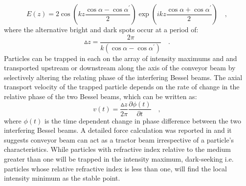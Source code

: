 \begin{equation}
\label{eq:conveyor electric field axis}
E(z) = 2 \cos \left( kz\frac{\cos \alpha - \cos \alpha ^{\prime}}{2}\right) \exp \left( ikz \frac{\cos \alpha + \cos \alpha ^{\prime}}{2}\right) \quad ,
\end{equation}
where the alternative bright and dark spots occur at a period of:
\begin{equation}
\label{eq:conveyor period}
\vartriangle z = \frac{2\pi}{k \left( \cos \alpha - \cos \alpha ^{\prime}\right)} \quad .
\end{equation}
Particles can be trapped in each on the array of intensity maximums and and transported upstream or downstream along the axis of the conveyor beam by selectively altering the relating phase of the interfering Bessel beams. The axial transport velocity of the trapped particle depends on the rate of change in the relative phase of the two Bessel beams, which can be written as:
\begin{equation}
\label{eq:conveyor velocity}
v(t) = \frac{\vartriangle z}{2\pi}\frac{\partial \phi (t)}{\partial t} \quad ,
\end{equation}
where $\phi (t)$ is the time dependent change in phase difference between the two interfering Bessel beams. A detailed force calculation was reported in \cite{ruffner2012prl} and it suggests conveyor beam can act as a tractor beam irrespective of a particle's characteristics. While particles with refractive index relative to the medium greater than one will be trapped in the intensity maximum, dark-seeking i.e. particles whose relative refractive index is less than one, will find the local intensity minimum as the stable point.


